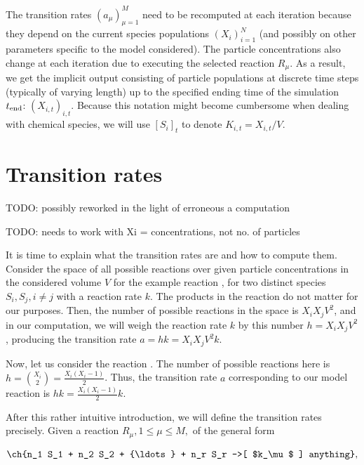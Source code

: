 The transition rates $(a_\mu)_{\mu=1}^M$ need to be recomputed at each iteration because they depend on the current species populations $(X_i)_{i=1}^N$ (and possibly on other parameters specific to the model considered). The particle concentrations also change at each iteration due to executing the selected reaction $R_\mu$. As a result, we get the implicit output consisting of particle populations at discrete time steps (typically of varying length) up to the specified ending time of the simulation $t_{\rm{end}}$: $(X_{i, t})_{i, t}$. Because this notation might become cumbersome when dealing with chemical species, we will use $\left[ S_i \right]_t$ to denote $K_{i, t} = X_{i, t}/V$.

\section{Transition rates}\label{section:transition-rates}

TODO: possibly reworked in the light of erroneous a computation

TODO: needs to work with Xi = concentrations, not no. of particles

It is time to explain what the transition rates are and how to compute them. Consider the space of all possible reactions over given particle concentrations in the considered volume $V$ for the example reaction , for two distinct species $S_i, S_j, i \neq j$ with a reaction rate $k$. The products in the reaction do not matter for our purposes. Then, the number of possible reactions in the space is $X_iX_jV^2$, and in our computation, we will weigh the reaction rate $k$ by this number $h = X_iX_jV^2$, producing the transition rate $a = hk = X_iX_jV^2k$.

Now, let us consider the reaction . The number of possible reactions here is $h = {X_i \choose 2} = \frac{X_i(X_i - 1)}{2}$. Thus, the transition rate $a$ corresponding to our model reaction is $hk = \frac{X_i(X_i - 1)}{2}k$.

After this rather intuitive introduction, we will define the transition rates precisely. Given a reaction $R_\mu, 1 \leq \mu \leq M, $ of the general form 

\begin{center}
\begin{gather*}
\ch{n_1 S_1 + n_2 S_2 + {\ldots} + n_r S_r ->[ $k_\mu$ ] anything}, 
\end{gather*}
\end{center}

